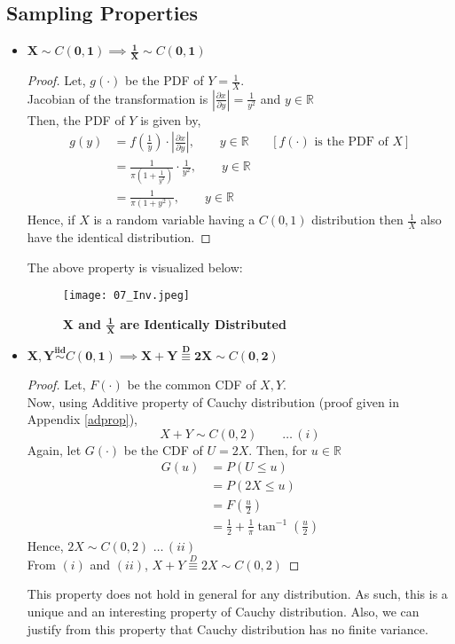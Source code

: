 \documentclass[12pt, fleqn, a4paper]{article}
\begin{document}
	\subsection{Sampling Properties}
	\begin{itemize}
		\item $ \bm{X\sim\mathit{C}(0,1)\implies \frac{1}{X} \sim\mathit{C}(0,1)} $
		\begin{proof}
			Let, \(g(\cdot)\) be the PDF of \(Y=\frac{1}{X}\). \\ Jacobian of the transformation is \(\left|\frac{\partial x}{\partial y}\right|= \frac{1}{y^2}\) and \(y\in\mathbb{R}\) \\ Then, the PDF of \(Y\) is given by, 
			\begin{align*}
				g(y)&=f\left(\frac{1}{y}\right)\cdot\left|\frac{\partial x}{\partial y}\right|,\qquad y\in\mathbb{R} && [f(\cdot) \text{ is the PDF of } X]\\
				&=\frac{1}{\pi\left(1+\frac{1}{y^2}\right)}\cdot\frac{1}{y^2},\qquad y\in\mathbb{R} \\
				&=\frac{1}{\pi(1+y^2)},\qquad y\in\mathbb{R}
			\end{align*}
			Hence, if \(X\) is a random variable having a \(\mathit{C}(0,1)\) distribution then \(\frac{1}{X}\) also have the identical distribution.
		\end{proof}
		The above property is visualized below:
		\begin{figure}[H] \centering
			\texttt{[image: 07\_Inv.jpeg]}
			\caption{\textbf{X and $\mathbf{\frac{1}{X}}$ are Identically Distributed}}
		\end{figure}
		
		\item $ \bm{X,Y\stackrel{iid}{\sim}\mathit{C}(0,1) \implies X+Y\stackrel{D}{\equiv}2X\sim \mathit{C}(0,2)} $
		\begin{proof}
			Let, \(F(\cdot)\) be the common CDF of \(X,Y\). \\ Now, using Additive property of Cauchy distribution (proof given in Appendix \ref{adprop}),  $$X+Y\sim\mathit{C}(0,2)\qquad\ldots\,(i)$$ Again, let \(G(\cdot)\) be the CDF of \(U=2X\). Then, for \(u\in\mathbb{R}\)
			\begin{align*}
				G(u)&=P(U\leq u) \\
				&=P(2X\leq u) \\
				&=F\left(\frac{u}{2}\right) \\
				&=\frac{1}{2}+\frac{1}{\pi}\tan^{-1}\left(\frac{u}{2}\right)
			\end{align*}
			Hence, \(2X\sim\mathit{C}(0,2)\)\hspace{30pt} $\ldots\,(ii)$ \\ From \((i)\) and \((ii)\), \(X+Y\stackrel{D}{\equiv}2X\sim\mathit{C}(0,2)\)
		\end{proof}
	This property does not hold in general for any distribution. As such, this is a unique and an interesting property of Cauchy distribution. Also, we can justify from this property that Cauchy distribution has no finite variance. 

\end{itemize}
\end{document}
